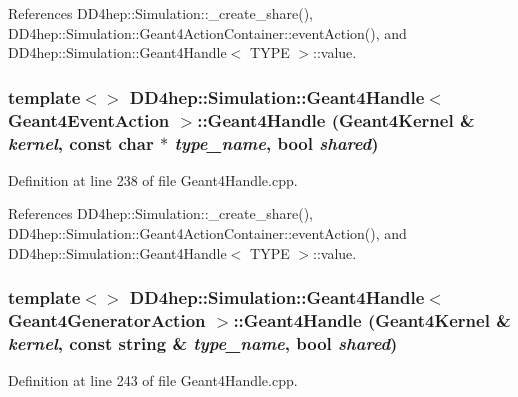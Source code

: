 References DD4hep::Simulation::\_\-create\_\-share(), DD4hep::Simulation::Geant4ActionContainer::eventAction(), and DD4hep::Simulation::Geant4Handle$<$ TYPE $>$::value.\hypertarget{class_d_d4hep_1_1_simulation_1_1_geant4_handle_a3d9d3747c9c2fb8c6ed4cdf2ff4c5d63}{
\subsubsection[{Geant4Handle}]{\setlength{\rightskip}{0pt plus 5cm}template$<$$>$ {\bf DD4hep::Simulation::Geant4Handle}$<$ {\bf Geant4EventAction} $>$::{\bf Geant4Handle} ({\bf Geant4Kernel} \& {\em kernel}, \/  const char $\ast$ {\em type\_\-name}, \/  bool {\em shared})}}
\label{class_d_d4hep_1_1_simulation_1_1_geant4_handle_a3d9d3747c9c2fb8c6ed4cdf2ff4c5d63}


Definition at line 238 of file Geant4Handle.cpp.

References DD4hep::Simulation::\_\-create\_\-share(), DD4hep::Simulation::Geant4ActionContainer::eventAction(), and DD4hep::Simulation::Geant4Handle$<$ TYPE $>$::value.\hypertarget{class_d_d4hep_1_1_simulation_1_1_geant4_handle_ac0b529aeedcc63eefc998a3b465f42c3}{
\subsubsection[{Geant4Handle}]{\setlength{\rightskip}{0pt plus 5cm}template$<$$>$ {\bf DD4hep::Simulation::Geant4Handle}$<$ {\bf Geant4GeneratorAction} $>$::{\bf Geant4Handle} ({\bf Geant4Kernel} \& {\em kernel}, \/  const {\bf string} \& {\em type\_\-name}, \/  bool {\em shared})}}
\label{class_d_d4hep_1_1_simulation_1_1_geant4_handle_ac0b529aeedcc63eefc998a3b465f42c3}


Definition at line 243 of file Geant4Handle.cpp.

